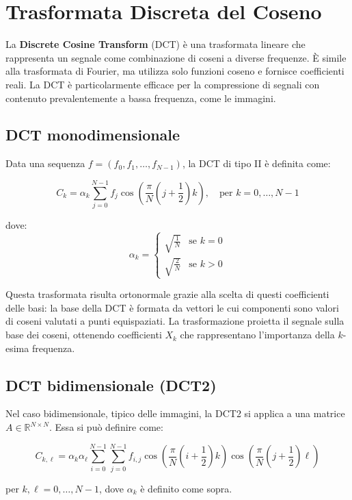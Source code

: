\section{Trasformata Discreta del Coseno}

La \textbf{Discrete Cosine Transform} (DCT) è una trasformata lineare che rappresenta un segnale come combinazione di coseni a diverse frequenze. È simile alla trasformata di Fourier, ma utilizza solo funzioni coseno e fornisce coefficienti reali. La DCT è particolarmente efficace per la compressione di segnali con contenuto prevalentemente a bassa frequenza, come le immagini.

\subsection{DCT monodimensionale}

Data una sequenza $f = (f_0, f_1, \dots, f_{N-1})$, la DCT di tipo II è definita come:

\[
C_k = \alpha_k \sum_{j=0}^{N-1} f_j \cos\left( \frac{\pi}{N} \left(j + \frac{1}{2} \right) k \right), \quad \text{per } k = 0, \dots, N-1
\]


dove:
\[
\alpha_k = 
\begin{cases}
\sqrt{\frac{1}{N}} & \text{se } k = 0 \\
\sqrt{\frac{2}{N}} & \text{se } k > 0
\end{cases}
\]

Questa trasformata risulta ortonormale grazie alla scelta di questi coefficienti delle basi: la base della DCT è formata da vettori le cui componenti sono valori di coseni valutati a punti equispaziati. La trasformazione proietta il segnale sulla base dei coseni, ottenendo coefficienti $X_k$ che rappresentano l'importanza della $k$-esima frequenza.

\subsection{DCT bidimensionale (DCT2)}

Nel caso bidimensionale, tipico delle immagini, la DCT2 si applica a una matrice $A \in \mathbb{R}^{N \times N}$. Essa si può definire come:

\[
C_{k,\ell} = \alpha_k \alpha_\ell \sum_{i=0}^{N-1} \sum_{j=0}^{N-1}
f_{i,j} \cos\left( \frac{\pi}{N} \left(i + \frac{1}{2} \right) k \right)
\cos\left( \frac{\pi}{N} \left(j + \frac{1}{2} \right) \ell \right)
\]

per $k, \ell = 0, \dots, N-1$, dove $\alpha_k$ è definito come sopra.

